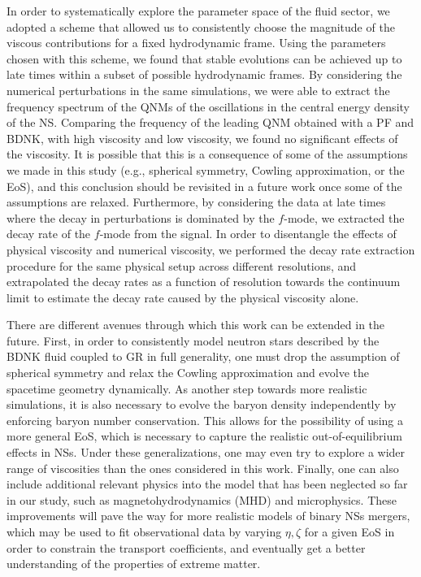\documentclass[prd,aps,twocolumn,floats,floatfix,nofootinbib,superscriptaddress] {revtex4-1}
\begin{document}
In order to systematically explore the parameter space of the fluid sector, we adopted a scheme that allowed us to consistently choose the magnitude of the viscous contributions for a fixed hydrodynamic frame.  Using the parameters chosen with this scheme, we found that stable evolutions can be achieved up to late times within a subset of possible hydrodynamic frames.  By considering the numerical perturbations in the same simulations, we were able to extract the frequency spectrum of the QNMs of the oscillations in the central energy density of the NS.  Comparing the frequency of the leading QNM obtained with a PF and BDNK, with high viscosity and low viscosity, we found no significant effects of the viscosity.  It is possible that this is a consequence of some of the assumptions we made in this study (e.g., spherical symmetry, Cowling approximation, or the EoS), and this conclusion should be revisited in a future work once some of the assumptions are relaxed.  Furthermore, by considering the data at late times where the decay in perturbations is dominated by the $f$-mode, we extracted the decay rate of the $f$-mode from the signal.  In order to disentangle the effects of physical viscosity and numerical viscosity, we performed the decay rate extraction procedure for the same physical setup across different resolutions, and extrapolated the decay rates as a function of resolution towards the continuum limit to estimate the decay rate caused by the physical viscosity alone.

There are different avenues through which this work can be extended in the future. First, in order to consistently model neutron stars described by the BDNK fluid coupled to GR in full generality, one must drop the assumption of spherical symmetry and relax the Cowling approximation and evolve the spacetime geometry dynamically.   As another step towards more realistic simulations, it is also necessary to evolve the baryon density independently by enforcing baryon number conservation.  This allows for the possibility of using a more general EoS, which is necessary to capture the realistic out-of-equilibrium effects in NSs.  Under these generalizations, one may even try to explore a wider range of viscosities than the ones considered in this work.  Finally, one can also include additional relevant physics into the model that has been neglected so far in our study, such as magnetohydrodynamics (MHD) and microphysics.  These improvements will pave the way for more realistic models of binary NSs mergers, which may be used to fit observational data by varying $\eta, \zeta$ for a given EoS in order to constrain the transport coefficients, and eventually get a better understanding of the properties of extreme matter.
\end{document}
